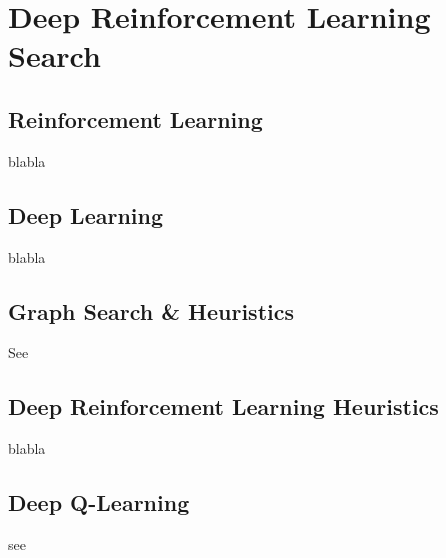 
\chapter{Deep Reinforcement Learning Search} %

\label{Chapter1} %


\section{Reinforcement Learning}

blabla


\section{Deep Learning}

blabla


\section{Graph Search \& Heuristics}

See \cite{DBLP:journals/jacm/DechterP85}



\section{Deep Reinforcement Learning Heuristics}

blabla



\section{Deep Q-Learning}

see \cite{Watkins1992}
